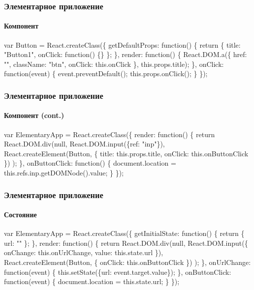 \documentclass[10pt,utf8]{beamer}
\begin{document}
\begin{frame}[fragile]
  \frametitle{Элементарное приложение}
  \framesubtitle{Компонент}

  \fontsize{9pt}{9.2}\selectfont

  \begin{semiverbatim}
    var \alert{Button} = React.createClass(\{
      getDefaultProps: function() \{
        return \{ title: "Button1"\phantom{},
                 onClick: function() \{\} \};
      \},
      render: function() \{
        React.DOM.a(\{ href: "\phantom{}"\phantom{},
                      className: "btn"\phantom{},
                      onClick: this.onClick \},
          this.props.title);
      \},
      onClick: function(event) \{
        event.preventDefault();
        this.props.onClick();
      \}
    \});
  \end{semiverbatim}
\end{frame}

\begin{frame}[fragile]
  \frametitle{Элементарное приложение}
  \framesubtitle{Компонент (cont.)}

  \begin{semiverbatim}
    var ElementaryApp = React.createClass(\{
      render: function() \{
        return React.DOM.div(null,
          React.DOM.input(\{ref: "inp"\}),
          \alert{React.createElement(Button,
            \{ title: this.props.title,
              onClick: this.onButtonClick \})}
        );
      \},
      onButtonClick: function() \{
        document.location = this.refs.inp.getDOMNode().value;
      \}
    \});
  \end{semiverbatim}
\end{frame}

\begin{frame}[fragile]
  \frametitle{Элементарное приложение}
  \framesubtitle{Состояние}

  \fontsize{9pt}{9.2}\selectfont

  \begin{semiverbatim}
    var ElementaryApp = React.createClass(\{
      getInitialState: function() \{
        return \{ \alert{url: "\phantom{}"} \};
      \},
      render: function() \{
        return React.DOM.div(null,
          React.DOM.input(\{ onChange: this.onUrlChange,
                            value: \alert{this.state.url} \}),
          React.createElement(Button, \{ onClick: this.onButtonClick \})
        );
      \},
      onUrlChange: function(event) \{
        \alert{this.setState(\{url: event.target.value\});}
      \},
      onButtonClick: function(event) \{
        document.location = \alert{this.state.url};
      \}
    \});
  \end{semiverbatim}
\end{frame}
\end{document}
